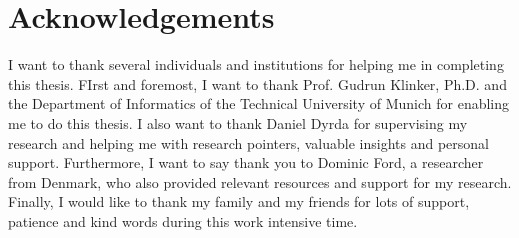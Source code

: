 \chapter{Acknowledgements}

I want to thank several individuals and institutions for helping me in completing this thesis. FIrst and foremost, I want to thank Prof. Gudrun Klinker, Ph.D. and the Department of Informatics of the Technical University of Munich for enabling me to do this thesis. I also want to thank Daniel Dyrda for supervising my research and helping me with research pointers, valuable insights and personal support. Furthermore, I want to say thank you to Dominic Ford, a researcher from Denmark, who also provided relevant resources and support for my research. Finally, I would like to thank my family and my friends for lots of support, patience and kind words during this work intensive time.
